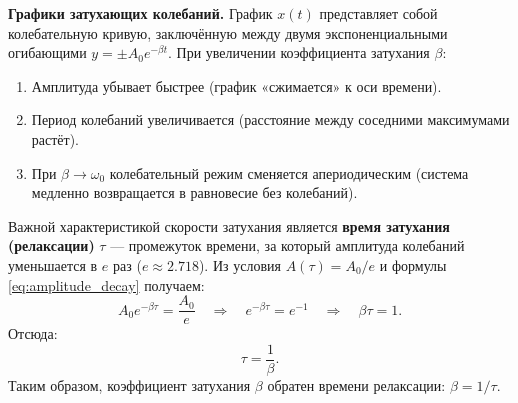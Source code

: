 \begin{remark}
\textbf{Графики затухающих колебаний.} График $x(t)$ представляет собой колебательную кривую, заключённую между двумя экспоненциальными огибающими $y = \pm A_0 e^{-\beta t}$. При увеличении коэффициента затухания $\beta$:
\begin{enumerate}
    \item Амплитуда убывает быстрее (график «сжимается» к оси времени).
    \item Период колебаний увеличивается (расстояние между соседними максимумами растёт).
    \item При $\beta \to \omega_0$ колебательный режим сменяется апериодическим (система медленно возвращается в равновесие без колебаний).
\end{enumerate}
\end{remark}

\begin{theorem}
Важной характеристикой скорости затухания является \textbf{время затухания (релаксации)} $\tau$ --- промежуток времени, за который амплитуда колебаний уменьшается в $e$ раз ($e \approx 2.718$).
Из условия $A(\tau) = A_0 / e$ и формулы \eqref{eq:amplitude_decay} получаем:
\begin{equation}
    A_0 e^{-\beta \tau} = \frac{A_0}{e} \quad \Rightarrow \quad e^{-\beta \tau} = e^{-1} \quad \Rightarrow \quad \beta \tau = 1.
\end{equation}
Отсюда:
\begin{equation}
    \tau = \frac{1}{\beta}. \label{eq:relaxation_time}
\end{equation}
Таким образом, коэффициент затухания $\beta$ обратен времени релаксации: $\beta = 1/\tau$.
\end{theorem}

\vspace{1cm}

